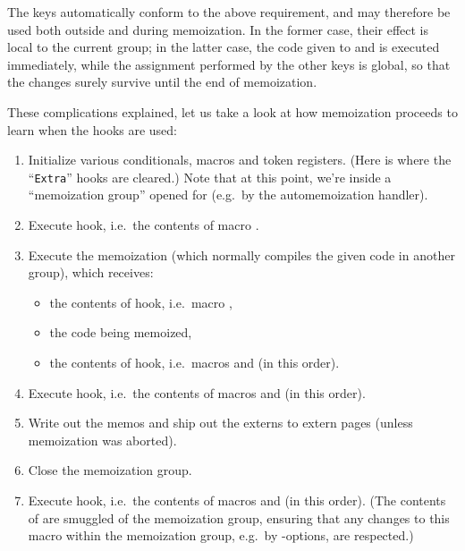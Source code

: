 \documentclass[a4paper,11pt]{article}
\begin{document}
\begin{doc}
  The keys automatically conform to the above requirement, and may therefore be
  used both outside and during memoization.  In the former case, their effect
  is local to the current group; in the latter case, the code given to
   and  is executed
  immediately, while the assignment performed by the other keys is global, so
  that the changes surely survive until the end of memoization.

  These complications explained, let us take a look at how memoization proceeds
  to learn when the hooks are used:
  \begin{enumerate}
  \item Initialize various conditionals, macros and token registers.  (Here is
    where the ``\texttt{Extra}'' hooks are cleared.)  Note that at this point,
    we're inside a ``memoization group'' opened for  (e.g.\ by
    the automemoization handler).
  \item Execute  hook, i.e.\ the contents of
    macro .
  \item Execute the memoization  (which normally compiles the
    given code in another  group), which receives:
    \begin{itemize}
    \item the contents of  hook, i.e.\ macro
      ,
    \item the code being memoized,
    \item the contents of  hook, i.e.\ macros
       and  (in
      this order).
    \end{itemize}
  \item Execute  hook, i.e.\ the contents of macros
     and  (in this
    order).
  \item Write out the memos and ship out the externs to extern pages (unless
    memoization was aborted).
  \item Close the memoization group.
  \item Execute  hook, i.e.\ the contents of macros
     and  (in this
    order).  (The contents of  are smuggled of the
    memoization group, ensuring that any changes to this macro within the
    memoization group, e.g.\ by -options, are respected.)
  \end{enumerate}
\end{doc}
\end{document}
